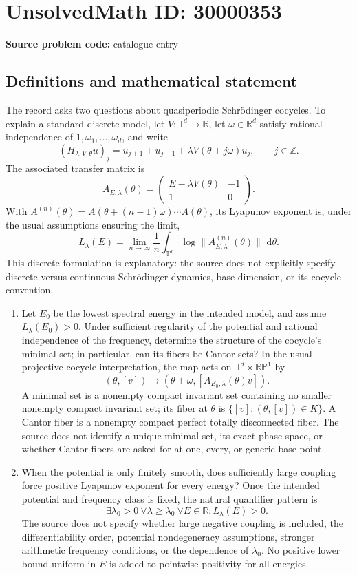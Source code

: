 \documentclass[11pt]{article}
\newcommand{\Z}{\mathbb{Z}}
\newcommand{\R}{\mathbb{R}}
\newcommand{\PP}{\mathbb{P}}
\newcommand{\dd}{\,\mathrm{d}}
\begin{document}
\section*{UnsolvedMath ID: 30000353}
\textbf{Source problem code:} catalogue entry
\subsection{Definitions and mathematical statement}
The record asks two questions about quasiperiodic Schr\"odinger cocycles. To explain a standard discrete model, let $V:\mathbb T^d\to\R$, let $\omega\in\R^d$ satisfy rational independence of $1,\omega_1,\ldots,\omega_d$, and write
\[
 (H_{\lambda,V,\theta}u)_j=u_{j+1}+u_{j-1}
       +\lambda V(\theta+j\omega)u_j,\qquad j\in\Z.
\]
The associated transfer matrix is
\[
 A_{E,\lambda}(\theta)=
 \begin{pmatrix}E-\lambda V(\theta)&-1\\1&0\end{pmatrix}.
\]
With $A^{(n)}(\theta)=A(\theta+(n-1)\omega)\cdots A(\theta)$, its Lyapunov exponent is, under the usual assumptions ensuring the limit,
\[
 L_\lambda(E)=\lim_{n\to\infty}\frac1n
     \int_{\mathbb T^d}\log\|A_{E,\lambda}^{(n)}(\theta)\|\,\dd\theta.
\]
This discrete formulation is explanatory: the source does not explicitly specify discrete versus continuous Schr\"odinger dynamics, base dimension, or its cocycle convention.

\begin{enumerate}
\item Let $E_0$ be the lowest spectral energy in the intended model, and assume $L_\lambda(E_0)>0$. Under sufficient regularity of the potential and rational independence of the frequency, determine the structure of the cocycle's minimal set; in particular, can its fibers be Cantor sets? In the usual projective-cocycle interpretation, the map acts on $\mathbb T^d\times\R\PP^1$ by
\[
 (\theta,[v])\longmapsto(\theta+\omega,[A_{E_0,\lambda}(\theta)v]).
\]
A minimal set is a nonempty compact invariant set containing no smaller nonempty compact invariant set; its fiber at $\theta$ is $\{[v]:(\theta,[v])\in K\}$. A Cantor fiber is a nonempty compact perfect totally disconnected fiber. The source does not identify a unique minimal set, its exact phase space, or whether Cantor fibers are asked for at one, every, or generic base point.
\item When the potential is only finitely smooth, does sufficiently large coupling force positive Lyapunov exponent for every energy? Once the intended potential and frequency class is fixed, the natural quantifier pattern is
\[
 \exists\lambda_0>0\ \forall\lambda\ge\lambda_0\ \forall E\in\R:
       L_\lambda(E)>0.
\]
The source does not specify whether large negative coupling is included, the differentiability order, potential nondegeneracy assumptions, stronger arithmetic frequency conditions, or the dependence of $\lambda_0$. No positive lower bound uniform in $E$ is added to pointwise positivity for all energies.
\end{enumerate}
\end{document}

